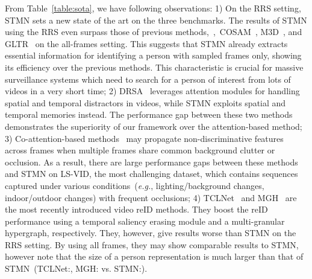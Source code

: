 \documentclass[10pt,twocolumn,letterpaper]{article}
\begin{document}
		From Table~\ref{table:sota}, we have following observations: 1) On the RRS setting, STMN sets a new state of the art on the three benchmarks. The results of STMN using the RRS even surpass those of previous methods,~\eg,~COSAM~\cite{subramaniam2019co}, M3D~\cite{li2019multi}, and GLTR~\cite{li2019global} on the all-frames setting. This suggests that STMN already extracts essential information for identifying a person with sampled frames only, showing its efficiency over the previous methods. This characteristic is crucial for massive surveillance systems which need to search for a person of interest from lots of videos in a very short time; 2) DRSA~\cite{li2018diversity} leverages attention modules for handling spatial and temporal distractors in videos, while STMN exploits spatial and temporal memories instead. The performance gap between these two methods demonstrates the superiority of our framework over the attention-based method; 3) Co-attention-based methods~\cite{liu2019spatially,li2019global,yan2020learning} may propagate non-discriminative features across frames when multiple frames share common background clutter or occlusion. As a result, there are large performance gaps between these methods and STMN on LS-VID, the most challenging dataset, which contains sequences captured under various conditions~(\emph{e.g.}, lighting/background changes, indoor/outdoor changes) with frequent occlusions; 4) TCLNet~\cite{hou2020temporal} and MGH~\cite{yan2020learning} are the most recently introduced video reID methods. They boost the reID performance using a temporal saliency erasing module and a multi-granular hypergraph, respectively. They, however, give results worse than STMN on the RRS setting. By using all frames, they may show comparable results to STMN, however note that the size of a person representation is much larger than that of STMN~(TCLNet:, MGH: vs. STMN:).
		
\end{document}
